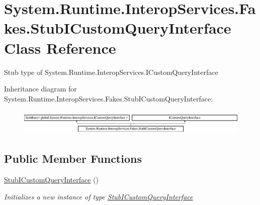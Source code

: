 \hypertarget{class_system_1_1_runtime_1_1_interop_services_1_1_fakes_1_1_stub_i_custom_query_interface}{\section{System.\-Runtime.\-Interop\-Services.\-Fakes.\-Stub\-I\-Custom\-Query\-Interface Class Reference}
\label{class_system_1_1_runtime_1_1_interop_services_1_1_fakes_1_1_stub_i_custom_query_interface}
}


Stub type of System.\-Runtime.\-Interop\-Services.\-I\-Custom\-Query\-Interface 


Inheritance diagram for System.\-Runtime.\-Interop\-Services.\-Fakes.\-Stub\-I\-Custom\-Query\-Interface\-:\begin{figure}[H]
\begin{center}
\leavevmode
\includegraphics[height=1.244444cm]{class_system_1_1_runtime_1_1_interop_services_1_1_fakes_1_1_stub_i_custom_query_interface}
\end{center}
\end{figure}
\subsection*{Public Member Functions}
\begin{DoxyCompactItemize}
\item 
\hyperlink{class_system_1_1_runtime_1_1_interop_services_1_1_fakes_1_1_stub_i_custom_query_interface_aba392e6e0db277ccd63bebf8a6be70c3}{Stub\-I\-Custom\-Query\-Interface} ()
\begin{DoxyCompactList}\small\item\em Initializes a new instance of type \hyperlink{class_system_1_1_runtime_1_1_interop_services_1_1_fakes_1_1_stub_i_custom_query_interface}{Stub\-I\-Custom\-Query\-Interface}\end{DoxyCompactList}\end{DoxyCompactItemize}
